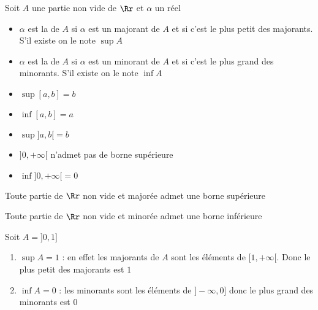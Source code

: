 \begin{frame}
\begin{mydefinition}
\label{def:sup-inf}
Soit $A$ une partie non vide de $\Rr$ et $\alpha$ un réel
\begin{itemize}
  \item $\alpha$ est la  de $A$ si $\alpha$ est un majorant de $A$ et 
si c'est le plus petit des majorants. S'il existe on le note $\sup A$
\pause
  \item $\alpha$ est la  de $A$ si $\alpha$ est un minorant de 
$A$ et si c'est le plus grand des minorants. S'il existe on le note $\inf A$
\end{itemize}
\end{mydefinition}

\pause

\begin{exemple}
\begin{itemize}
  \item $\sup[a,b]=b$
  \item $\inf[a,b]=a$
  \item $\sup]a,b[=b$
  \item $]0,+\infty[$ n'admet pas de borne supérieure
  \item $\inf ]0,+\infty[ =0$
\end{itemize}
\end{exemple}
\end{frame}

\begin{frame}

\begin{theoreme}[$\Rr4$]
Toute partie de $\Rr$ non vide et majorée admet une borne supérieure
\end{theoreme}

\pause

Toute partie de $\Rr$ non vide et minorée admet une borne inférieure

\pause
\bigskip

\begin{exemple}
Soit $A=]0,1]$
\pause
\begin{enumerate}  
  \item $\sup A=1$ \pause : en effet les majorants de $A$ sont les éléments de $[1,+\infty[$. \pause Donc le plus petit des majorants est $1$
  \pause
  \item $\inf A=0$  \pause: les minorants sont les éléments de $]-\infty,0]$ \pause donc le plus grand des minorants est $0$
\end{enumerate}  
\end{exemple}


\end{frame}


